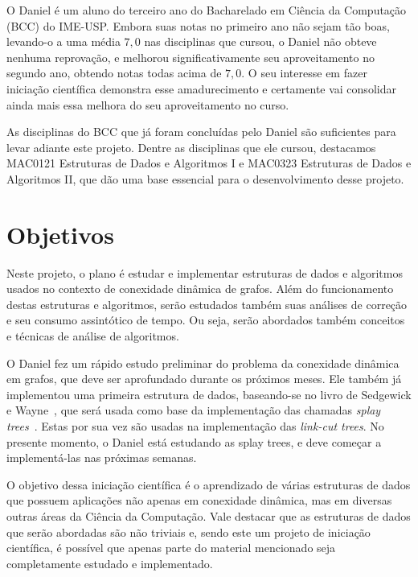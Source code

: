 \documentclass[12pt]{article}
\begin{document}

O Daniel é um aluno do terceiro ano do Bacharelado em Ciência da Computação (BCC) 
do IME-USP. Embora suas notas no primeiro ano não sejam tão boas, levando-o a 
uma média $7{,}0$ nas disciplinas que cursou, o Daniel não obteve nenhuma reprovação, 
e melhorou significativamente seu aproveitamento no segundo ano, obtendo notas todas
acima de $7{,}0$.  O seu interesse em fazer iniciação científica demonstra esse 
amadurecimento e certamente vai consolidar ainda mais essa melhora do seu 
aproveitamento no curso. 

As disciplinas do BCC que já foram concluídas pelo Daniel são suficientes 
para levar adiante este projeto.  Dentre as disciplinas que ele cursou, 
destacamos {\small\sc MAC0121 Estruturas de Dados e Algoritmos I} e 
{\small\sc MAC0323 Estruturas de Dados e Algoritmos II}, que dão 
uma base essencial para o desenvolvimento desse projeto. 

\section{Objetivos}

Neste projeto, o plano é estudar e implementar estruturas de dados e algoritmos
usados no contexto de conexidade dinâmica de grafos.  Além do funcionamento destas 
estruturas e algoritmos, serão estudados também suas análises de correção e seu 
consumo assintótico de tempo.  Ou seja, serão abordados também conceitos e técnicas
de análise de algoritmos. 

O Daniel fez um rápido estudo preliminar do problema da conexidade dinâmica em grafos, 
que deve ser aprofundado durante os próximos meses. Ele também já implementou uma 
primeira estrutura de dados, baseando-se no livro de Sedgewick e Wayne~\cite{SedgewickW2011},
que será usada como base da implementação das chamadas \emph{splay trees}~\cite{SleatorT1985}. 
Estas por sua vez são usadas na implementação das \emph{link-cut trees}. 
No presente momento, o Daniel está estudando as splay trees, e deve começar a 
implementá-las nas próximas semanas. 

O objetivo dessa iniciação científica é o aprendizado de várias estruturas de dados 
que possuem aplicações não apenas em conexidade dinâmica, mas em diversas outras 
áreas da Ciência da Computação.  Vale destacar que as estruturas de dados que serão 
abordadas são não triviais e, sendo este um projeto de iniciação científica, é 
possível que apenas parte do material mencionado seja completamente estudado e
implementado. 
\end{document}
